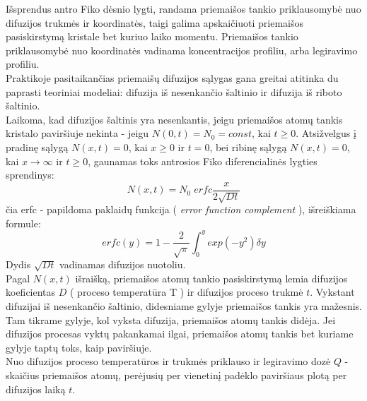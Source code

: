 \documentclass[11pt,a4paper]{article}
\begin{document}
Išsprendus antro Fiko dėsnio lygti, randama priemaišos tankio priklausomybė nuo difuzijos trukmės ir koordinatės, 
taigi galima apskaičiuoti priemaišos pasiskirstymą kristale bet kuriuo laiko momentu. 
Priemaišos tankio priklausomybė nuo koordinatės vadinama koncentracijos profiliu, arba legiravimo profiliu.\\

Praktikoje pasitaikančias priemaišų difuzijos sąlygas gana greitai atitinka du paprasti teoriniai modeliai: difuzija iš nesenkančio šaltinio ir difuzija iš riboto šaltinio.\\

Laikoma, kad difuzijos šaltinis yra nesenkantis, jeigu priemaišos atomų tankis kristalo paviršiuje nekinta - jeigu $N(0,t) = N_0 = const$, 
kai $t \geq 0$. Atsižvelgus į pradinę sąlygą $N(x,t) = 0$, kai $x \geq 0 $ ir $t=0$, bei ribinę sąlygą $N(x,t)=0$, 
kai $x \rightarrow \infty$ ir $t \geq 0$, gaunamas toks antrosios Fiko diferencialinės lygties sprendinys:
\begin{equation}
N(x,t) = N_0\;erfc\frac{x}{2\sqrt{Dt}}
\end{equation}
čia erfc - papildoma paklaidų funkcija ( \emph{error function complement} ), išreiškiama formule:
\begin{equation}
erfc(y) = 1 - \frac{2}{\sqrt{\pi}} \int^y_0 exp(-y^2) \delta y
\end{equation}
Dydis $\sqrt{Dt}$ vadinamas difuzijos nuotoliu.\\
Pagal $N(x,t)$ išraišką, priemaišos atomų tankio pasiskirstymą lemia difuzijos koeficientas $D$ ( proceso temperatūra T ) ir difuzijos proceso trukmė $t$. Vykstant difuzijai iš nesenkančio šaltinio, didesniame gylyje priemaišos tankis yra mažesnis. Tam tikrame gylyje, kol vyksta difuzija, priemaišos atomų tankis didėja. Jei difuzijos procesas vyktų pakankamai ilgai, priemaišos atomų tankis bet kuriame gylyje taptų toks, kaip paviršiuje.\\

Nuo difuzijos proceso temperatūros ir trukmės priklauso ir legiravimo dozė $Q$ -  skaičius priemaišos atomų, perėjusių per vienetinį padėklo paviršiaus plotą per difuzijos laiką $t$.\\
\end{document}
